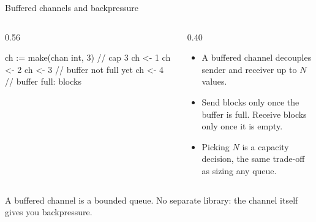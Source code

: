 \documentclass[10pt,aspectratio=169,t]{beamer}
\begin{document}
\begin{frame}[fragile,eyebrow=Goroutines]{Buffered channels and backpressure}
  \begin{columns}[T]
    \begin{column}{0.56\textwidth}
\begin{golang}
ch := make(chan int, 3) // cap 3
ch <- 1
ch <- 2
ch <- 3 // buffer not full yet
ch <- 4 // buffer full: blocks
\end{golang}
    \end{column}
    \begin{column}{0.40\textwidth}
      \begin{itemize}
        \item A buffered channel decouples sender and receiver up to \(N\) values.
        \item Send blocks only once the buffer is full. Receive blocks only once it is empty.
        \item Picking \(N\) is a capacity decision, the same trade-off as sizing any queue.
      \end{itemize}
    \end{column}
  \end{columns}
  \begin{takeaway}{A buffered channel is a bounded queue.}
    No separate library: the channel itself gives you backpressure.
  \end{takeaway}
\end{frame}
\end{document}
